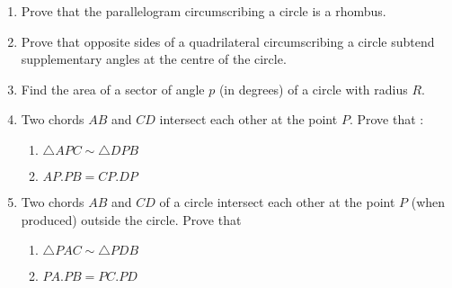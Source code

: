 \begin{enumerate}[label=\arabic*.,ref=\thesubsection.\theenumi]
\item  Prove that the parallelogram circumscribing a circle is a rhombus.
%
\item Prove that opposite sides of a quadrilateral circumscribing a circle subtend supplementary angles at the centre of the circle.
%
\item Find the area of a sector of angle $p$ (in degrees) of a circle with radius $R$. 
\item  Two chords $AB$ and $CD$ intersect each other at the point $P$. Prove that : 
\begin{enumerate}
\item   $\triangle  APC  \sim   \triangle  DPB$
\item  $AP . PB = CP . DP$
\end{enumerate}
\item Two chords $AB$ and $CD$ of a circle intersect each other at the point $P$ (when produced) outside the circle. Prove that 
\begin{enumerate}
\item   $\triangle  PAC  \sim   \triangle  PDB$
\item  $PA . PB = PC . PD$
\end{enumerate}

\end{enumerate}
